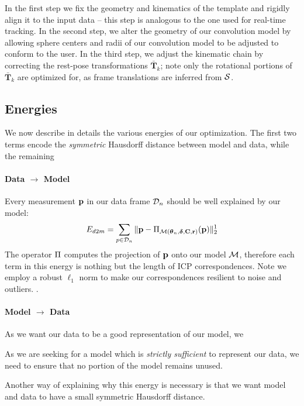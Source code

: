 % 
In the first step we fix the geometry and kinematics of the template and rigidly align it to the input data -- this step is analogous to the one used for real-time tracking. In the second step, we alter the geometry of our convolution model by allowing sphere centers and radii of our convolution model to be adjusted to conform to the user. In the third step, we adjust the kinematic chain by correcting the rest-pose transformations $\mathbf{\bar{T}}_k$; note only the rotational portions of $\mathbf{\bar{T}}_k$ are optimized for, as frame translations are inferred from $\mathcal{S}$.



\subsection{Energies}
We now describe in details the various energies of our optimization. The first two terms encode the \emph{symmetric} Hausdorff distance between model and data, while the remaining 

\paragraph{Data $\rightarrow$ Model}
Every measurement $\mathbf{p}$ in our data frame $\mathcal{D}_n$ should be well explained by our model:
\begin{equation}
E_{d2m} = \sum_{p \in \mathcal{D}_n} \| \mathbf{p} - \Pi_{\mathcal{M}(\boldsymbol{\theta}_n, \boldsymbol{\delta}, \mathbf{C}, \mathbf{r})}(\mathbf{p})\|_2^1
\end{equation}
% 
The operator $\Pi$ computes the projection of $\mathbf{p}$ onto our model $\mathcal{M}$, therefore each term in this energy is nothing but the length of ICP correspondences. Note we employ a robust $\ell_1$ norm to make our correspondences resilient to noise and outliers. .

\paragraph{Model $\rightarrow$ Data}
As we want our data to be a good representation of our model, we 

As we are seeking for a model which is \emph{strictly sufficient} to represent our data, we need to ensure that no portion of the model remains unused. 

Another way of explaining why this energy is necessary is that we want model and data to have a small symmetric Hausdorff distance. 


